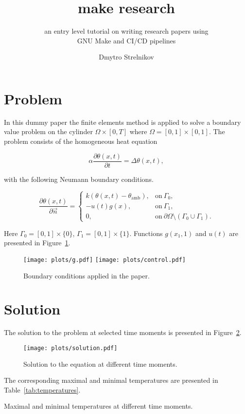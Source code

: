 \documentclass[parskip=half]{scrartcl}
\title{make research}
\subtitle{an entry level tutorial on writing research papers using\\ GNU Make and CI/CD pipelines}
\author{Dmytro Strelnikov}
\begin{document}
\maketitle

\section{Problem}

In this dummy paper the finite elements method is applied to solve a boundary value problem on the cylinder $\Omega \times [0,T]$ where $\Omega = [0,1] \times [0,1]$. The problem consists of the homogeneous heat equation

\begin{equation} \label{eq:heat_eq}
	\alpha \frac{\partial \theta(x,t)}{\partial t} = \Delta \theta(x,t),
\end{equation}

with the following Neumann boundary conditions.

\begin{equation} \label{eq:bc}
	\frac{\partial \theta(x,t)}{\partial \vec{n}} = \left\{
		\begin{array}{ll}
			k (\theta(x,t) - \theta_\text{amb}), & \text{on}\ \Gamma_0, \\
			- u(t) g(x), & \text{on}\ \Gamma_1, \\
			0, & \text{on}\ \partial\Omega \setminus (\Gamma_0 \cup \Gamma_1).
		\end{array}
		\right.
\end{equation}

Here $\Gamma_0 = [0,1] \times \{0\}$, $\Gamma_1 = [0,1] \times \{1\}$. Functions $g(x_1, 1)$ and $u(t)$ are presented in Figure~\ref{fig:bc}.

\begin{figure} \label{fig:bc}
	\centering
	\texttt{[image: plots/g.pdf]}
	\texttt{[image: plots/control.pdf]}
	\caption{Boundary conditions applied in the paper.}
\end{figure}


\section{Solution}

The solution to the problem at selected time moments is presented in Figure~\ref{fig:solution}.

\begin{figure} \label{fig:solution}
	\centering
	\texttt{[image: plots/solution.pdf]}
	\caption{Solution to the equation at different time moments.}
\end{figure}

The corresponding maximal and minimal temperatures are presented in Table~\ref{tab:temperatures}.

\begin{table} \label{tab:temperatures}
	\centering
	
	\caption{Maximal and minimal temperatures at different time moments.}
\end{table}
\end{document}
